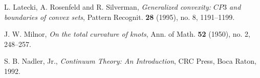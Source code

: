 \documentclass{amsart}
\theoremstyle{definition}
\theoremstyle{remark}
\begin{document}
\begin{thebibliography}{9}

    L. Latecki, A. Rosenfeld and R. Silverman,
    \emph{Generalized convexity: $CP3$ and boundaries of convex sets},
    Pattern Recognit.
    \textbf{28} (1995), no. 8, 1191--1199.

    J. W. Milnor,
    \emph{On the total curvature of knots},
    Ann. of Math.
    \textbf{52} (1950), no. 2, 248--257.

    S. B. Nadler, Jr.,
    \emph{Continuum Theory: An Introduction},
    CRC Press, Boca Raton, 1992.

\end{thebibliography}
\end{document}
